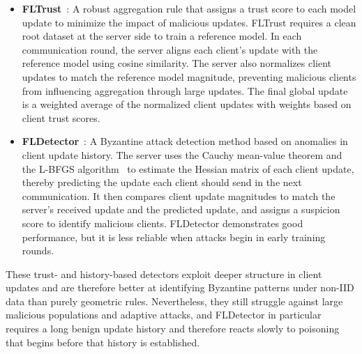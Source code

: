 \documentclass[journal]{IEEEtran}
\begin{document}
\begin{itemize}
    \item \textbf{FLTrust}~\cite{cao2020fltrust}: A robust aggregation rule that assigns a trust score to each model update to minimize the impact of malicious updates. FLTrust requires a clean root dataset at the server side to train a reference model. In each communication round, the server aligns each client's update with the reference model using cosine similarity. The server also normalizes client updates to match the reference model magnitude, preventing malicious clients from influencing aggregation through large updates. The final global update is a weighted average of the normalized client updates with weights based on client trust scores.

    \item \textbf{FLDetector}~\cite{zhang2022fldetector}: A Byzantine attack detection method based on anomalies in client update history. The server uses the Cauchy mean-value theorem and the L-BFGS algorithm~\cite{liu1989limited} to estimate the Hessian matrix of each client update, thereby predicting the update each client should send in the next communication. It then compares client update magnitudes to match the server's received update and the predicted update, and assigns a suspicion score to identify malicious clients. FLDetector demonstrates good performance, but it is less reliable when attacks begin in early training rounds.
\end{itemize}

These trust- and history-based detectors exploit deeper structure in client updates and are therefore better at identifying Byzantine patterns under non-IID data than purely geometric rules. Nevertheless, they still struggle against large malicious populations and adaptive attacks, and FLDetector in particular requires a long benign update history and therefore reacts slowly to poisoning that begins before that history is established.
\end{document}
